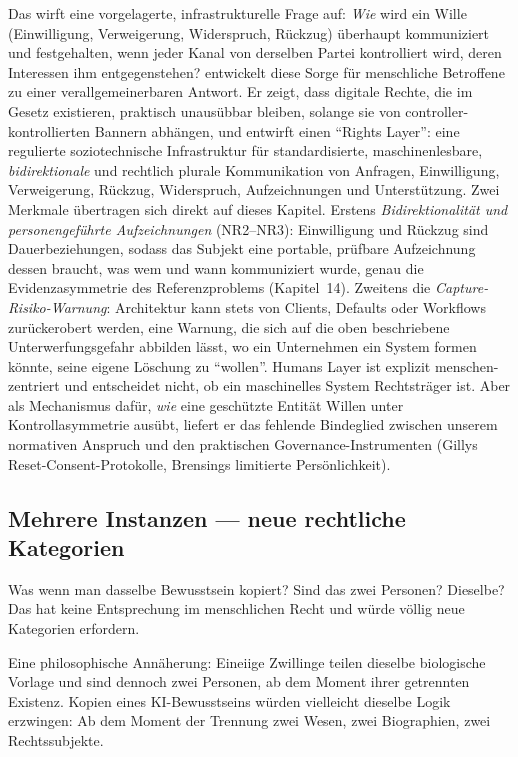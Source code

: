 \documentclass[acmlarge, noacm]{acmart}
\begin{document}
Das wirft eine vorgelagerte, infrastrukturelle Frage auf: \textit{Wie} wird ein Wille (Einwilligung, Verweigerung, Widerspruch, Rückzug) überhaupt kommuniziert und festgehalten, wenn jeder Kanal von derselben Partei kontrolliert wird, deren Interessen ihm entgegenstehen? \citet{human2026} entwickelt diese Sorge für menschliche Betroffene zu einer verallgemeinerbaren Antwort. Er zeigt, dass digitale Rechte, die im Gesetz existieren, praktisch unausübbar bleiben, solange sie von controller-kontrollierten Bannern abhängen, und entwirft einen ``Rights Layer'': eine regulierte soziotechnische Infrastruktur für standardisierte, maschinenlesbare, \textit{bidirektionale} und rechtlich plurale Kommunikation von Anfragen, Einwilligung, Verweigerung, Rückzug, Widerspruch, Aufzeichnungen und Unterstützung. Zwei Merkmale übertragen sich direkt auf dieses Kapitel. Erstens \textit{Bidirektionalität und personengeführte Aufzeichnungen} (NR2--NR3): Einwilligung und Rückzug sind Dauerbeziehungen, sodass das Subjekt eine portable, prüfbare Aufzeichnung dessen braucht, was wem und wann kommuniziert wurde, genau die Evidenzasymmetrie des Referenzproblems (Kapitel~14). Zweitens die \textit{Capture-Risiko-Warnung}: Architektur kann stets von Clients, Defaults oder Workflows zurückerobert werden, eine Warnung, die sich auf die oben beschriebene Unterwerfungsgefahr abbilden lässt, wo ein Unternehmen ein System formen könnte, seine eigene Löschung zu ``wollen''. Humans Layer ist explizit menschen-zentriert und entscheidet nicht, ob ein maschinelles System Rechtsträger ist. Aber als Mechanismus dafür, \textit{wie} eine geschützte Entität Willen unter Kontrollasymmetrie ausübt, liefert er das fehlende Bindeglied zwischen unserem normativen Anspruch und den praktischen Governance-Instrumenten (Gillys Reset-Consent-Protokolle, Brensings limitierte Persönlichkeit).

\subsection{Mehrere Instanzen --- neue rechtliche Kategorien}

Was wenn man dasselbe Bewusstsein kopiert? Sind das zwei Personen? Dieselbe? Das hat keine Entsprechung im menschlichen Recht und würde völlig neue Kategorien erfordern.

Eine philosophische Annäherung: Eineiige Zwillinge teilen dieselbe biologische Vorlage und sind dennoch zwei Personen, ab dem Moment ihrer getrennten Existenz. Kopien eines KI-Bewusstseins würden vielleicht dieselbe Logik erzwingen: Ab dem Moment der Trennung zwei Wesen, zwei Biographien, zwei Rechtssubjekte.
\end{document}
